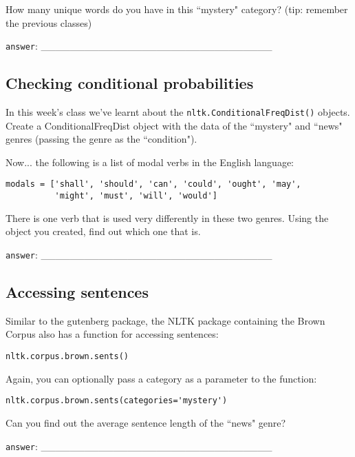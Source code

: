 \documentclass[a4paper,11pt]{scrartcl}
\begin{document}
How many unique words do you have in this ``mystery" category?
(tip: remember the previous classes)

\verb|answer|: \_\_\_\_\_\_\_\_\_\_\_\_\_\_\_\_\_\_\_\_\_\_\_\_\_\_\_\_\_\_\_\_


\subsection{Checking conditional probabilities}

In this week's class we've learnt about the \verb|nltk.ConditionalFreqDist()|
objects. Create a ConditionalFreqDist object with the data of the ``mystery"
and ``news" genres (passing the genre as the ``condition").

Now... the following is a list of modal verbs in the English language:

\begin{verbatim}
modals = ['shall', 'should', 'can', 'could', 'ought', 'may',
          'might', 'must', 'will', 'would']
\end{verbatim}

There is one verb that is used very differently in these two genres. Using the object you created, find out which one that is.

\verb|answer|: \_\_\_\_\_\_\_\_\_\_\_\_\_\_\_\_\_\_\_\_\_\_\_\_\_\_\_\_\_\_\_\_


\subsection{Accessing sentences}

Similar to the gutenberg package, the NLTK package containing the Brown Corpus
also has a function for accessing sentences:

\begin{verbatim}
nltk.corpus.brown.sents()
\end{verbatim}

Again, you can optionally pass a category as a parameter to the function:

\begin{verbatim}
nltk.corpus.brown.sents(categories='mystery')
\end{verbatim}

Can you find out the average sentence length of the ``news" genre?


\verb|answer|: \_\_\_\_\_\_\_\_\_\_\_\_\_\_\_\_\_\_\_\_\_\_\_\_\_\_\_\_\_\_\_\_
\end{document}
